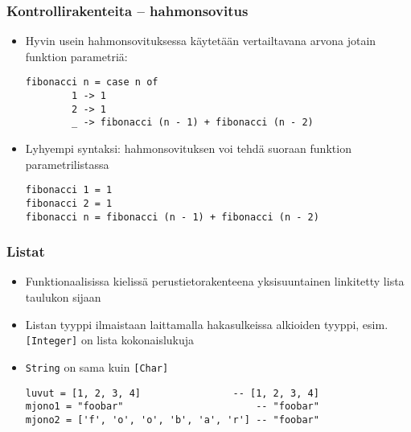 \documentclass{beamer}
\begin{document}
\begin{frame}[fragile]
\frametitle{Kontrollirakenteita -- hahmonsovitus}
\begin{itemize}
\item{Hyvin usein hahmonsovituksessa käytetään vertailtavana arvona jotain funktion parametriä:}
\begin{verbatim}
fibonacci n = case n of
        1 -> 1
        2 -> 1
        _ -> fibonacci (n - 1) + fibonacci (n - 2)
\end{verbatim}

\item{Lyhyempi syntaksi: hahmonsovituksen voi tehdä suoraan funktion parametrilistassa}

\begin{verbatim}
fibonacci 1 = 1
fibonacci 2 = 1
fibonacci n = fibonacci (n - 1) + fibonacci (n - 2)
\end{verbatim}
\end{itemize}
\end{frame}


\begin{frame}[fragile]
\frametitle{Listat}
\begin{itemize}
\item{Funktionaalisissa kielissä perustietorakenteena yksisuuntainen linkitetty lista taulukon sijaan}
\item{Listan tyyppi ilmaistaan laittamalla hakasulkeissa alkioiden tyyppi, esim. \texttt{[Integer]} on lista kokonaislukuja}
\item{\texttt{String} on sama kuin \texttt{[Char]}}

\begin{verbatim}
luvut = [1, 2, 3, 4]                -- [1, 2, 3, 4]
mjono1 = "foobar"                       -- "foobar"
mjono2 = ['f', 'o', 'o', 'b', 'a', 'r'] -- "foobar"
\end{verbatim}

\end{itemize}
\end{frame}
\end{document}
